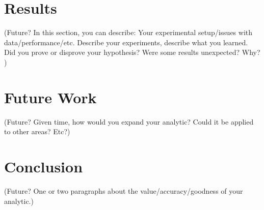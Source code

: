 \documentclass[letterpaper,twocolumn,10pt]{article}
\begin{document}
\section{Results}
(Future? In this section, you can describe: Your experimental setup/issues with data/performance/etc. Describe your experiments, describe what you learned. Did you prove or disprove your hypothesis? Were some results unexpected? Why? )

\section{Future Work}
(Future? Given time, how would you expand your analytic? Could it be applied to other areas? Etc?)

\section{Conclusion}
(Future? One or two paragraphs about the value/accuracy/goodness of your analytic.)
\end{document}
